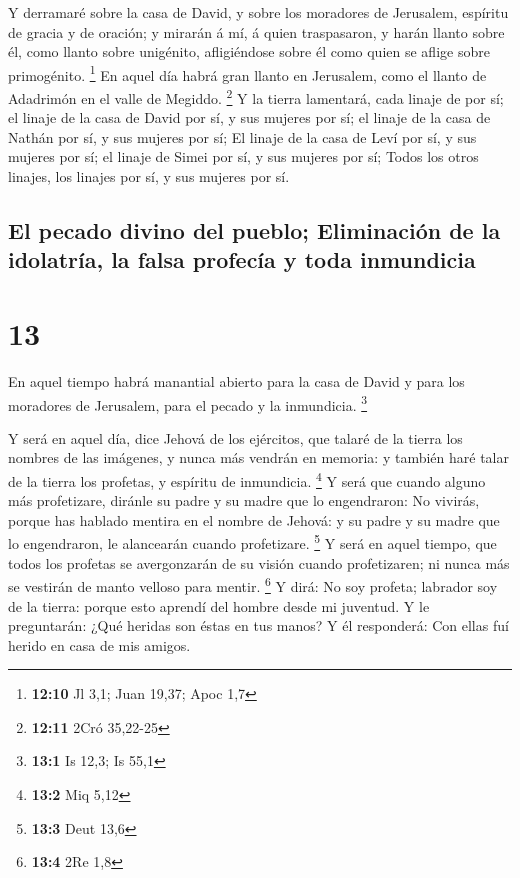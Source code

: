  Y derramaré sobre la casa de David, y sobre los moradores
de Jerusalem, espíritu de gracia y de oración; y mirarán á mí, á quien
traspasaron, y harán llanto sobre él, como llanto sobre unigénito,
afligiéndose sobre él como quien se aflige sobre primogénito.
\footnote{\textbf{12:10} Jl 3,1; Juan 19,37; Apoc 1,7}  En
aquel día habrá gran llanto en Jerusalem, como el llanto de Adadrimón en
el valle de Megiddo. \footnote{\textbf{12:11} 2Cró 35,22-25}
 Y la tierra lamentará, cada linaje de por sí; el linaje de
la casa de David por sí, y sus mujeres por sí; el linaje de la casa de
Nathán por sí, y sus mujeres por sí;  El linaje de la casa
de Leví por sí, y sus mujeres por sí; el linaje de Simei por sí, y sus
mujeres por sí;  Todos los otros linajes, los linajes por
sí, y sus mujeres por sí.

\hypertarget{el-pecado-divino-del-pueblo-eliminaciuxf3n-de-la-idolatruxeda-la-falsa-profecuxeda-y-toda-inmundicia}{%
\subsection{El pecado divino del pueblo; Eliminación de la idolatría, la
falsa profecía y toda
inmundicia}\label{el-pecado-divino-del-pueblo-eliminaciuxf3n-de-la-idolatruxeda-la-falsa-profecuxeda-y-toda-inmundicia}}

\hypertarget{section-12}{%
\section{13}\label{section-12}}

 En aquel tiempo habrá manantial abierto para la casa de
David y para los moradores de Jerusalem, para el pecado y la inmundicia.
\footnote{\textbf{13:1} Is 12,3; Is 55,1}

 Y será en aquel día, dice Jehová de los ejércitos, que
talaré de la tierra los nombres de las imágenes, y nunca más vendrán en
memoria: y también haré talar de la tierra los profetas, y espíritu de
inmundicia. \footnote{\textbf{13:2} Miq 5,12}  Y será que
cuando alguno más profetizare, diránle su padre y su madre que lo
engendraron: No vivirás, porque has hablado mentira en el nombre de
Jehová: y su padre y su madre que lo engendraron, le alancearán cuando
profetizare. \footnote{\textbf{13:3} Deut 13,6}  Y será en
aquel tiempo, que todos los profetas se avergonzarán de su visión cuando
profetizaren; ni nunca más se vestirán de manto velloso para mentir.
\footnote{\textbf{13:4} 2Re 1,8}  Y dirá: No soy profeta;
labrador soy de la tierra: porque esto aprendí del hombre desde mi
juventud.  Y le preguntarán: ¿Qué heridas son éstas en tus
manos? Y él responderá: Con ellas fuí herido en casa de mis amigos.

